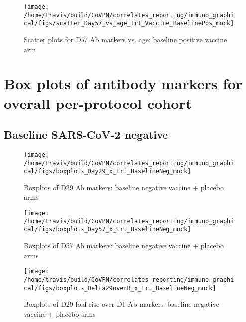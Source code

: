 \documentclass[]{book}
\theoremstyle{definition}
\theoremstyle{definition}
\theoremstyle{definition}
\newcommand{\1}{\mathbbm{1}}
\begin{document}
\begin{figure}[H]

{\centering \texttt{[image: /home/travis/build/CoVPN/correlates\_reporting/immuno\_graphical/figs/scatter\_Day57\_vs\_age\_trt\_Vaccine\_BaselinePos\_mock]} 

}

\caption{Scatter plots for D57 Ab markers vs. age: baseline positive vaccine arm}\label{fig:unnamed-chunk-36}
\end{figure}

\hypertarget{box-plots-of-antibody-markers-for-overall-per-protocol-cohort}{%
\section{Box plots of antibody markers for overall per-protocol cohort}\label{box-plots-of-antibody-markers-for-overall-per-protocol-cohort}}

\hypertarget{baseline-sars-cov-2-negative-2}{%
\subsection{Baseline SARS-CoV-2 negative}\label{baseline-sars-cov-2-negative-2}}

\begin{figure}[H]

{\centering \texttt{[image: /home/travis/build/CoVPN/correlates\_reporting/immuno\_graphical/figs/boxplots\_Day29\_x\_trt\_BaselineNeg\_mock]} 

}

\caption{Boxplots of D29 Ab markers: baseline negative vaccine + placebo arms}\label{fig:unnamed-chunk-37}
\end{figure}

\begin{figure}[H]

{\centering \texttt{[image: /home/travis/build/CoVPN/correlates\_reporting/immuno\_graphical/figs/boxplots\_Day57\_x\_trt\_BaselineNeg\_mock]} 

}

\caption{Boxplots of D57 Ab markers: baseline negative vaccine + placebo arms}\label{fig:unnamed-chunk-38}
\end{figure}

\begin{figure}[H]

{\centering \texttt{[image: /home/travis/build/CoVPN/correlates\_reporting/immuno\_graphical/figs/boxplots\_Delta29overB\_x\_trt\_BaselineNeg\_mock]} 

}

\caption{Boxplots of D29 fold-rise over D1 Ab markers: baseline negative vaccine + placebo arms}\label{fig:unnamed-chunk-39}
\end{figure}
\end{document}
